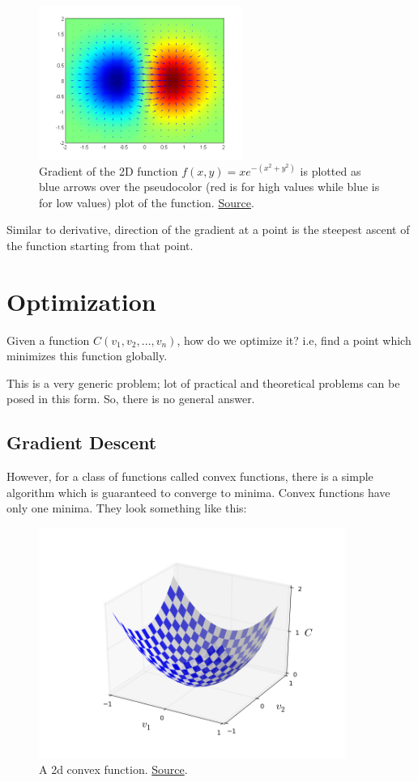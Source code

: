 \documentclass[a4paper]{tufte-handout}
\begin{document}
\begin{figure}
  \includegraphics[height=50mm]{gradient.png}
  \caption{Gradient of the 2D function \(f(x, y) = xe^{−(x^2 + y^2)}\) is
plotted as blue arrows over the pseudocolor (red is for high values
while blue is for low values) plot of the function.
\href{https://en.wikipedia.org/wiki/Gradient}{Source}.}
\end{figure}


Similar to derivative, direction of the gradient at a point is the
steepest ascent of the function starting from that point.

\section{Optimization}\label{optimization}

Given a function \(C(v_1, v_2, \ldots, v_n)\), how do we optimize it?
i.e, find a point which minimizes this function globally.

This is a very generic problem; lot of practical and theoretical
problems can be posed in this form. So, there is no general answer.

\subsection{Gradient Descent}\label{gradient-descent}

However, for a class of functions called convex functions, there is a
simple algorithm which is guaranteed to converge to minima. Convex
functions have only one minima. They look something like this:

\begin{figure}
  \includegraphics[width=100mm]{valley.png}
  \caption{A 2d convex function. 
  			\href{http://neuralnetworksanddeeplearning.com/chap1.html}{Source}.}
\end{figure}
\end{document}
